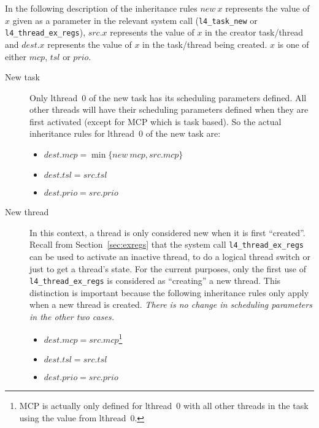 In the following description of the inheritance rules $new~x$
represents the value of $x$ given as a parameter in the relevant
system call ({\footnotesize\verb+l4_task_new+} or {\footnotesize\verb+l4_thread_ex_regs+}),
$src.x$ represents the value of $x$ in the creator task/thread and
$dest.x$ represents the value of $x$ in the task/thread being
created. $x$ is one of either $mcp$, $tsl$ or $prio$. 

\begin{description}

\item[New task] Only lthread~0 of the new task has its scheduling
  parameters defined.  All other threads will have their scheduling
  parameters defined when they are first activated (except for MCP
  which is task based). So the actual inheritance rules for lthread~0
  of the new task are:

  \begin{itemize}

    \item $dest.mcp = \min\{new~mcp, src.mcp\}$

    \item $dest.tsl = src.tsl$

    \item $dest.prio = src.prio$
      
  \end{itemize}

\item[New thread] In this context, a thread is only considered new
  when it is first ``created''. Recall from Section~\ref{sec:exregs}
  that the system call {\footnotesize\verb+l4_thread_ex_regs+} can be used to
  activate an inactive thread, to do a logical thread switch or just
  to get a thread's state. For the current purposes, only the first
  use of {\footnotesize\verb+l4_thread_ex_regs+} is considered as ``creating'' a new
  thread. This distinction is important because the following
  inheritance rules only apply when a new thread is created.
  \emph{There is no change in scheduling parameters in the other two
    cases.}
  
  \begin{itemize}

  \item $dest.mcp = src.mcp$\footnote{MCP is actually only defined for
      lthread~0 with all other threads in the task using the value from
      lthread~0.}

  \item $dest.tsl = src.tsl$

  \item $dest.prio = src.prio$
      
  \end{itemize}

\end{description}

